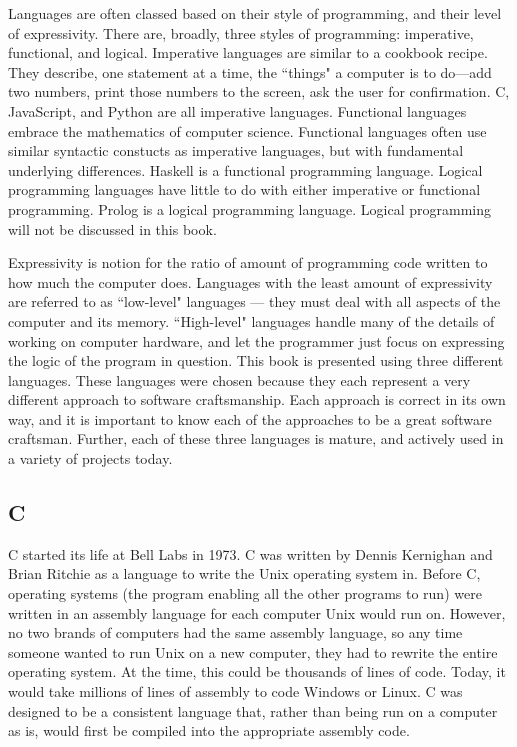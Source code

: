 Languages are often classed based on their style of programming, and their
level of expressivity. There are, broadly, three styles of programming:
imperative, functional, and logical. Imperative languages are similar to a
cookbook recipe. They describe, one statement at a time, the ``things" a
computer is to do---add two numbers, print those numbers to the screen, ask
the user for confirmation. C, JavaScript, and Python are all imperative
languages. Functional languages embrace the mathematics of computer science.
Functional languages often use similar syntactic constucts as imperative
languages, but with fundamental underlying differences. Haskell is a
functional programming language. Logical programming languages have little to
do with either imperative or functional programming. Prolog is a logical
programming language. Logical programming will not be discussed in this book.

Expressivity is notion for the ratio of amount of programming code written to
how much the computer does. Languages with the least amount of expressivity
are referred to as ``low-level" languages --- they must deal with all aspects
of the computer and its memory. ``High-level" languages handle many of the
details of working on computer hardware, and let the programmer just focus on
expressing the logic of the program in question. This book is presented using
three different languages. These languages were chosen because they each
represent a very different approach to software craftsmanship. Each approach
is correct in  its own way, and it is important to know each of the approaches
to be a great software craftsman. Further, each of these three languages is
mature, and actively used in a variety of projects today.

\subsection{C}

C started its life at Bell Labs in 1973. C was written by Dennis Kernighan and
Brian Ritchie as a language to write the Unix operating system in. Before C,
operating systems (the program enabling all the other programs to run) were
written in an assembly language for each computer Unix would run on. However,
no two brands of computers had the same assembly language, so any time someone
wanted to run Unix on a new computer, they had to rewrite the entire operating
system. At the time, this could be thousands of lines of code. Today, it would
take millions of lines of assembly to code Windows or Linux. C was designed to
be a consistent language that, rather than being run on a computer as is,
would first be compiled into the appropriate assembly code.

